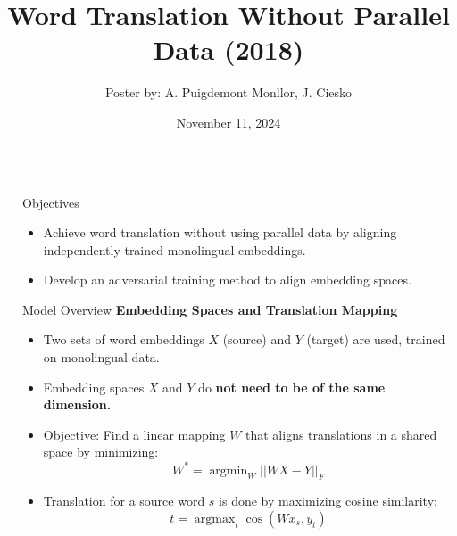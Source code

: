 \documentclass[final]{beamer}
\title[Word Translation Without Parallel Data]{Word Translation Without Parallel Data (2018)}
\author[ ]{\textcolor{secondarycolor}{Poster by: A. Puigdemont Monllor, J. Ciesko}}
\institute[FI MU]{\textcolor{primarycolor}{Faculty of Informatics, Masaryk University}}
\date{\textcolor{primarycolor}{November 11, 2024}}
\newlength{\sepwid}
\newlength{\onecolwid}
\DeclareMathOperator*{\argmax}{argmax}
\DeclareMathOperator*{\argmin}{argmin}
\begin{document}
\setlength{\belowcaptionskip}{2ex}
\setlength\belowdisplayshortskip{2ex}

\begin{frame}[t]

\begin{columns}[t]

\begin{column}{\sepwid}\end{column}

\begin{column}{\onecolwid}


\begin{alertblock}{Objectives} %
\begin{itemize}
    \item Achieve word translation without using parallel data by aligning independently trained monolingual embeddings.
    \item Develop an adversarial training method to align embedding spaces.
\end{itemize}
\end{alertblock}


\begin{block}{Model Overview}
    \textbf{Embedding Spaces and Translation Mapping}
    \begin{itemize}
        \item Two sets of word embeddings \( X \) (source) and \( Y \) (target) are used, trained on monolingual data.
        \item Embedding spaces \( X \) and \( Y \) do \textbf{not need to be of the same dimension.}
        \item Objective: Find a linear mapping \( W \) that aligns translations in a shared space by minimizing:
        \begin{equation}
            W^* = \argmin_{W} || W X - Y ||_F
        \end{equation}
        \item Translation for a source word \( s \) is done by maximizing cosine similarity:
        \begin{equation}
            t = \argmax_{t} \cos(W x_s, y_t)
        \end{equation}
    \end{itemize}
\end{block}


\end{column}
\end{columns}
\end{frame}
\end{document}
